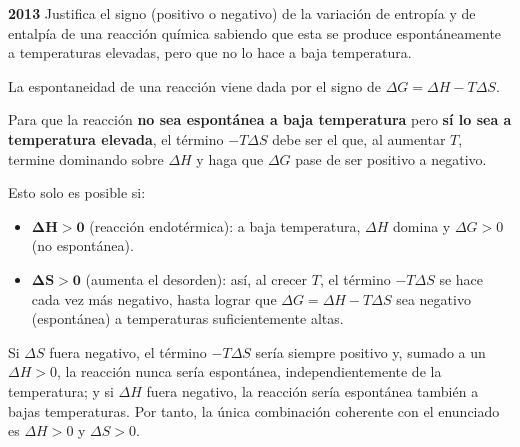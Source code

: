 \begin{exerciseEVAU}
    \textbf{2013} Justifica el signo (positivo o negativo) de la variación de entropía y de entalpía de una reacción
    química sabiendo que esta se produce espontáneamente a temperaturas elevadas, pero que no lo hace a baja temperatura.

    \begin{solu}

        La espontaneidad de una reacción viene dada por el signo de \(\Delta G = \Delta H - T \Delta S\).

        Para que la reacción \textbf{no sea espontánea a baja temperatura} pero \textbf{sí lo sea a temperatura elevada}, el término \(-T \Delta S\) debe ser el que, al aumentar \(T\), termine dominando sobre \(\Delta H\) y haga que \(\Delta G\) pase de ser positivo a negativo.

        Esto solo es posible si:
        \begin{itemize}
            \item \(\boldsymbol{\Delta H > 0}\) (reacción endotérmica): a baja temperatura, \(\Delta H\) domina y \(\Delta G > 0\) (no espontánea).
            \item \(\boldsymbol{\Delta S > 0}\) (aumenta el desorden): así, al crecer \(T\), el término \(-T\Delta S\) se hace cada vez más negativo, hasta lograr que \(\Delta G = \Delta H - T\Delta S\) sea negativo (espontánea) a temperaturas suficientemente altas.
        \end{itemize}

        Si \(\Delta S\) fuera negativo, el término \(-T\Delta S\) sería siempre positivo y, sumado a un \(\Delta H>0\), la reacción nunca sería espontánea, independientemente de la temperatura; y si \(\Delta H\) fuera negativo, la reacción sería espontánea también a bajas temperaturas. Por tanto, la única combinación coherente con el enunciado es \(\Delta H > 0\) y \(\Delta S > 0\).

    \end{solu}
\end{exerciseEVAU}

